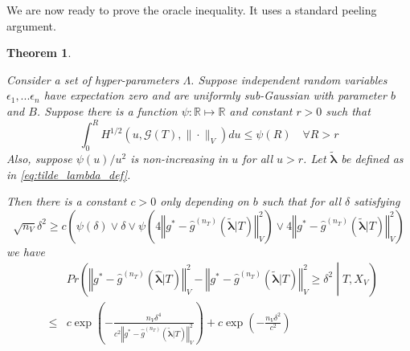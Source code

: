 \documentclass[12pt]{article}
\newtheorem{theorem}{Theorem}
\begin{document}
We are now ready to prove the oracle inequality. It uses a standard peeling argument.

\begin{theorem}
	\label{thrm:train_val_complicated}
	
	Consider a set of hyper-parameters $\Lambda$. Suppose independent random variables $\epsilon_1, ... \epsilon_n$ have expectation zero and are uniformly sub-Gaussian with parameter $b$ and $B$.
	Suppose there is a function $\psi:\mathbb{R}\mapsto\mathbb{R}$ and constant $r > 0$ such that
	\begin{equation}
	\label{eq:dudley_bound}
	\int_{0}^{R}H^{1/2}(u,\mathcal{G}(T),\|\cdot\|_{V})du\le\psi(R) \quad \forall R>r
	\end{equation}
	Also, suppose $\psi\left(u\right)/u^{2}$ is non-increasing in $u$ for all $u > r$.
	Let $\tilde{\boldsymbol \lambda}$ be defined as in \eqref{eq:tilde_lambda_def}.
	
	Then there is a constant $c>0$ only depending on $b$ such that for all $\delta$ satisfying
	\begin{equation}
	\label{eq:train_val_delta_condn}
	\sqrt{n_V}\delta^{2}
	\ge
	c \left ( 
	\psi(\delta)
	\vee 
	\delta
	\vee
	\psi \left (
	4\left\Vert g^* - \hat{g}^{(n_T)}( \tilde{\boldsymbol{\lambda}} | T)\right\Vert_{V}^2
	\right ) 
	\vee
	4 \left\Vert g^* - \hat{g}^{(n_T)}( \tilde{\boldsymbol{\lambda}} | T)\right\Vert_{V}^2
	\right )
	\end{equation}
	we have
	\begin{eqnarray*}
		&& Pr\left(
		\left\Vert g^* - \hat{g}^{(n_T)}( \hat{\boldsymbol{\lambda}} | T) \right\Vert _{V}^2 -
		\left\Vert g^* - \hat{g}^{(n_T)}( \tilde{\boldsymbol{\lambda}} | T) \right\Vert _{V}^2
		\ge\delta^2
		\middle | 
		T, X_V
		\right )\\
		&\le& c\exp\left(-\frac{n_{V}\delta^{4}}{
			c^{2}
			\left\Vert g^* - \hat{g}^{(n_T)}( \tilde{\boldsymbol{\lambda}} | T) \right\Vert _{V}^2
		}\right) 
		+c\exp\left(-\frac{n_{V}\delta^{2}}{c^{2}}\right)
	\end{eqnarray*}
\end{theorem}
\end{document}

